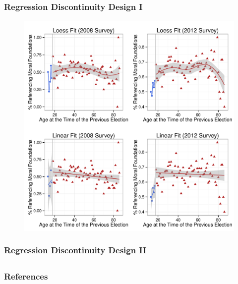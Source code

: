 \documentclass{beamer}
\begin{document}
\subsection{}
\begin{frame}%
\frametitle{Regression Discontinuity Design I}
  \begin{figure}[ht]\centering
    \includegraphics[height=.85\textheight]{../calc/fig/rd1_overview}
  \end{figure}
\end{frame}
\begin{frame}%
\frametitle{Regression Discontinuity Design II}
\begin{scriptsize}


\end{scriptsize}
\end{frame}

\subsection{}
\begin{frame}
  \frametitle{References}
  \def\newblock{\hskip .11em plus .33em minus .07em}
  \begin{scriptsize}
    
    
  \end{scriptsize}
\end{frame}
\end{document}
